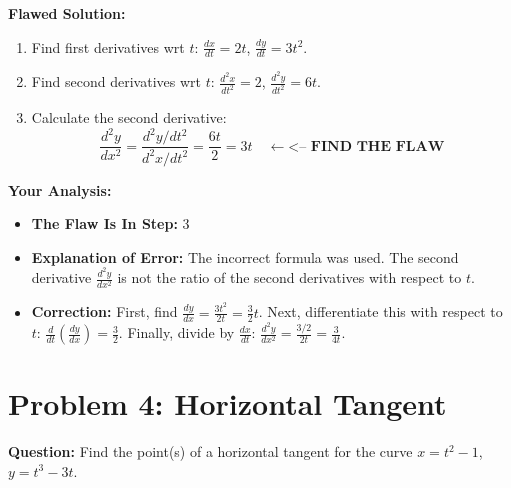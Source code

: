 \documentclass{article}
\begin{document}
\textbf{Flawed Solution:}
\begin{enumerate}
    \item Find first derivatives wrt $t$: $\frac{dx}{dt} = 2t$, $\frac{dy}{dt} = 3t^2$.
    \item Find second derivatives wrt $t$: $\frac{d^2x}{dt^2} = 2$, $\frac{d^2y}{dt^2} = 6t$.
    \item Calculate the second derivative:
    \[ \frac{d^2y}{dx^2} = \frac{d^2y/dt^2}{d^2x/dt^2} = \frac{6t}{2} = 3t \quad \longleftarrow \textbf{<-- FIND THE FLAW} \]
\end{enumerate}
\textbf{Your Analysis:}
\begin{itemize}
    \item \textbf{The Flaw Is In Step:} 3
    \item \textbf{Explanation of Error:} The incorrect formula was used. The second derivative $\frac{d^2y}{dx^2}$ is not the ratio of the second derivatives with respect to $t$.
    \item \textbf{Correction:}
    First, find $\frac{dy}{dx} = \frac{3t^2}{2t} = \frac{3}{2}t$.
    Next, differentiate this with respect to $t$: $\frac{d}{dt}(\frac{dy}{dx}) = \frac{3}{2}$.
    Finally, divide by $\frac{dx}{dt}$: $\frac{d^2y}{dx^2} = \frac{3/2}{2t} = \frac{3}{4t}$.
\end{itemize}

\section{Problem 4: Horizontal Tangent}
\textbf{Question:} Find the point(s) of a horizontal tangent for the curve $x=t^2-1$, $y=t^3-3t$.
\end{document}
